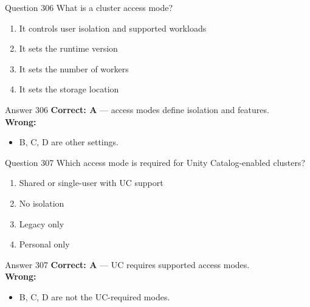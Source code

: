 \documentclass[aspectratio=169,11pt]{beamer}
\begin{document}
	\begin{frame}{Question 306}
		What is a cluster access mode?
		\begin{enumerate}[label=\Alph*.]
			\item It controls user isolation and supported workloads
			\item It sets the runtime version
			\item It sets the number of workers
			\item It sets the storage location
		\end{enumerate}
	\end{frame}
	\begin{frame}{Answer 306}
		\textbf{Correct: A} --- access modes define isolation and features.\\
		\vspace{0.5em}
		\textbf{Wrong:}
		\begin{itemize}
			\item B, C, D are other settings.
		\end{itemize}
	\end{frame}
	
	\begin{frame}{Question 307}
		Which access mode is required for Unity Catalog-enabled clusters?
		\begin{enumerate}[label=\Alph*.]
			\item Shared or single-user with UC support
			\item No isolation
			\item Legacy only
			\item Personal only
		\end{enumerate}
	\end{frame}
	\begin{frame}{Answer 307}
		\textbf{Correct: A} --- UC requires supported access modes.\\
		\vspace{0.5em}
		\textbf{Wrong:}
		\begin{itemize}
			\item B, C, D are not the UC-required modes.
		\end{itemize}
	\end{frame}
	
\end{document}
